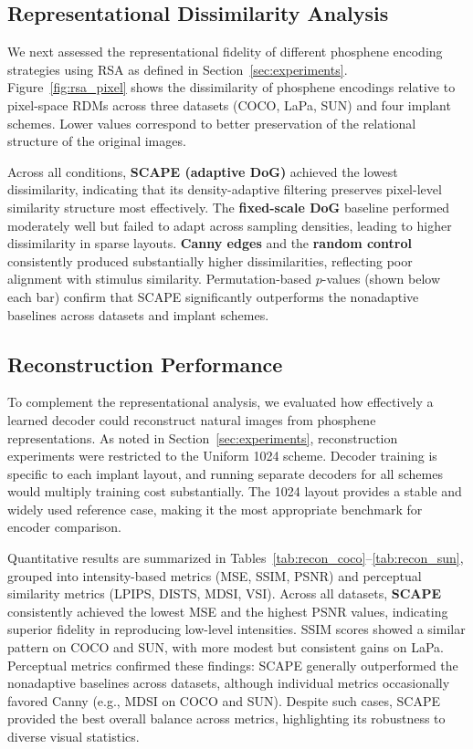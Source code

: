 \subsection{Representational Dissimilarity Analysis}
We next assessed the representational fidelity of different phosphene encoding strategies using RSA as defined in Section~\ref{sec:experiments}. 
Figure~\ref{fig:rsa_pixel} shows the dissimilarity of phosphene encodings relative to pixel-space RDMs across three datasets (COCO, LaPa, SUN) and four implant schemes. 
Lower values correspond to better preservation of the relational structure of the original images.

Across all conditions, \textbf{SCAPE (adaptive DoG)} achieved the lowest dissimilarity, indicating that its density-adaptive filtering preserves pixel-level similarity structure most effectively. 
The \textbf{fixed-scale DoG} baseline performed moderately well but failed to adapt across sampling densities, leading to higher dissimilarity in sparse layouts. 
\textbf{Canny edges} and the \textbf{random control} consistently produced substantially higher dissimilarities, reflecting poor alignment with stimulus similarity. 
Permutation-based $p$-values (shown below each bar) confirm that SCAPE significantly outperforms the nonadaptive baselines across datasets and implant schemes.


\subsection{Reconstruction Performance}
To complement the representational analysis, we evaluated how effectively a learned decoder could reconstruct natural images from phosphene representations. 
As noted in Section~\ref{sec:experiments}, reconstruction experiments were restricted to the Uniform 1024 scheme. 
Decoder training is specific to each implant layout, and running separate decoders for all schemes would multiply training cost substantially. 
The 1024 layout provides a stable and widely used reference case, making it the most appropriate benchmark for encoder comparison.

Quantitative results are summarized in Tables~\ref{tab:recon_coco}--\ref{tab:recon_sun}, grouped into intensity-based metrics (MSE, SSIM, PSNR) and perceptual similarity metrics (LPIPS, DISTS, MDSI, VSI).
Across all datasets, \textbf{SCAPE} consistently achieved the lowest MSE and the highest PSNR values, indicating superior fidelity in reproducing low-level intensities. 
SSIM scores showed a similar pattern on COCO and SUN, with more modest but consistent gains on LaPa. 
Perceptual metrics confirmed these findings: SCAPE generally outperformed the nonadaptive baselines across datasets, although individual metrics occasionally favored Canny (e.g., MDSI on COCO and SUN). 
Despite such cases, SCAPE provided the best overall balance across metrics, highlighting its robustness to diverse visual statistics.

